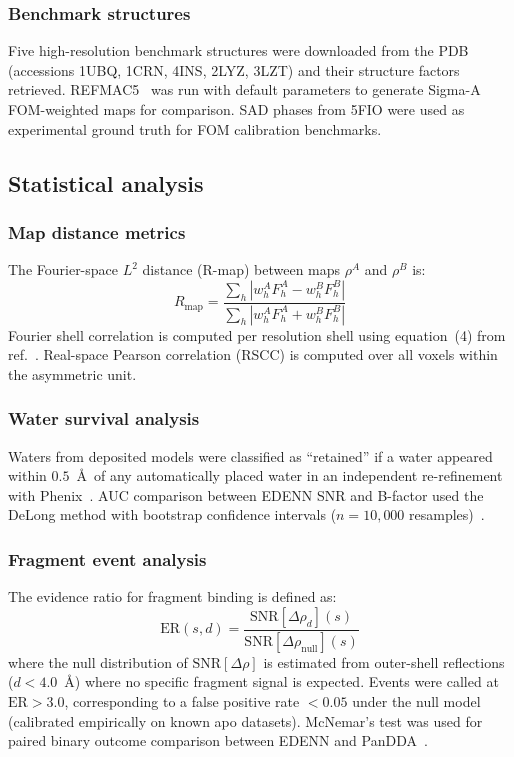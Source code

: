 \documentclass[10pt,twocolumn]{article}
\newcommand{\rhodiff}{\Delta\rho}
\newcommand{\SNR}{\mathrm{SNR}}
\begin{document}
\subsubsection{Benchmark structures}

Five high-resolution benchmark structures were downloaded from the
PDB (accessions 1UBQ, 1CRN, 4INS, 2LYZ, 3LZT) and their
structure factors retrieved.
REFMAC5~\cite{murshudov1997} was run with default parameters to
generate Sigma-A FOM-weighted maps for comparison.
SAD phases from 5FIO were used as experimental ground truth for
FOM calibration benchmarks.

\subsection{Statistical analysis}

\subsubsection{Map distance metrics}

The Fourier-space $L^2$ distance (R-map) between maps
$\rho^A$ and $\rho^B$ is:
\begin{equation}
  R_{\mathrm{map}} = \frac{\sum_h|w^A_h F^A_h - w^B_h F^B_h|}
    {\sum_h|w^A_h F^A_h + w^B_h F^B_h|}
  \label{eq:rmap}
\end{equation}
Fourier shell correlation is computed per resolution shell using
equation~(4) from ref.~\cite{nakane2020}.
Real-space Pearson correlation (RSCC) is computed over all
voxels within the asymmetric unit.

\subsubsection{Water survival analysis}

Waters from deposited models were classified as ``retained'' if a
water appeared within $0.5$~\AA\ of any automatically placed water
in an independent re-refinement with Phenix~\cite{liebschner2019}.
AUC comparison between EDENN SNR and B-factor used the DeLong
method with bootstrap confidence intervals ($n=10{,}000$
resamples)~\cite{delong1988}.

\subsubsection{Fragment event analysis}

The evidence ratio for fragment binding is defined as:
\begin{equation}
  \mathrm{ER}(s,d)
  = \frac{\SNR[\rhodiff_d](s)}{\SNR[\rhodiff_{\mathrm{null}}](s)}
  \label{eq:er}
\end{equation}
where the null distribution of $\SNR[\rhodiff]$ is estimated from
outer-shell reflections ($d < 4.0$~\AA) where no specific fragment
signal is expected.
Events were called at $\mathrm{ER} > 3.0$, corresponding to a
false positive rate $< 0.05$ under the null model (calibrated
empirically on known apo datasets).
McNemar's test was used for paired binary outcome comparison
between EDENN and PanDDA~\cite{mcnemar1947}.
\end{document}
